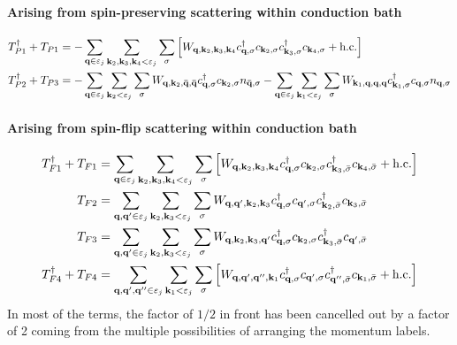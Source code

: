 \documentclass{revtex4-2}
\begin{document}
\paragraph{Arising from spin-preserving scattering within conduction bath}
\begin{equation}\begin{aligned}
	T_{P1}^\dagger + T_{P1} &= -\sum_{{\bf q} \in \varepsilon_j}\sum_{{\bf k}_2, {\bf k}_3, {\bf k}_4 < \varepsilon_j}\sum_{\sigma} \left[W_{{\bf q},{\bf k}_2,{\bf k}_3,{\bf k}_4}c^\dagger_{{\bf q},\sigma}c_{{\bf k}_2,\sigma}c^\dagger_{{\bf k}_3,\sigma}c_{{\bf k}_4,\sigma} + \text{h.c.}\right]\\
	T_{P2}^\dagger + T_{P3} &= -\sum_{{\bf q} \in \varepsilon_j}\sum_{{\bf k}_2 < \varepsilon_j}\sum_{\sigma} W_{{\bf q},{\bf k}_2,{\bf \bar q}, {\bf \bar q}} c^\dagger_{{\bf q},\sigma}c_{{\bf k}_2,\sigma} n_{{\bf \bar q},\sigma} -\sum_{{\bf q} \in \varepsilon_j}\sum_{{\bf k}_1 < \varepsilon_j}\sum_{\sigma} W_{{\bf k}_1,{\bf q},{\bf q},{\bf q}} c^\dagger_{{\bf k}_1,\sigma}c_{{\bf q},\sigma} n_{{\bf q},\sigma}
\end{aligned}\end{equation}
\paragraph{Arising from spin-flip scattering within conduction bath}
\begin{equation}\begin{aligned}
	T_{F1}^\dagger + T_{F1} &= \sum_{{\bf q} \in \varepsilon_j}\sum_{{\bf k}_2, {\bf k}_3, {\bf k}_4 < \varepsilon_j}\sum_{\sigma} \left[W_{{\bf q},{\bf k}_2,{\bf k}_3,{\bf k}_4}c^\dagger_{{\bf q},\sigma}c_{{\bf k}_2,\sigma}c^\dagger_{{\bf k}_3,\bar\sigma}c_{{\bf k}_4,\bar\sigma} + \text{h.c.}\right]\\
	T_{F2} &= \sum_{{\bf q}, {\bf q}^\prime \in \varepsilon_j}\sum_{{\bf k}_2, {\bf k}_3 < \varepsilon_j}\sum_{\sigma}W_{{\bf q},{\bf q}^\prime,{\bf k}_2,{\bf k}_3} c^\dagger_{{\bf q},\sigma}c_{{\bf q}^\prime,\sigma}c^\dagger_{{\bf k}_2,\bar\sigma}c_{{\bf k}_3,\bar\sigma}\\
	T_{F3} &= \sum_{{\bf q}, {\bf q}^\prime \in \varepsilon_j}\sum_{{\bf k}_2, {\bf k}_3 < \varepsilon_j}\sum_{\sigma} W_{{\bf q},{\bf k}_2,{\bf k}_3,{\bf q}^\prime} c^\dagger_{{\bf q},\sigma}c_{{\bf k}_2,\sigma}c^\dagger_{{\bf k}_3,\bar\sigma}c_{{\bf q}^\prime,\bar\sigma} \\
	T_{F4}^\dagger + T_{F4} &= \sum_{{\bf q}, {\bf q}^\prime, {\bf q}^{\prime\prime} \in \varepsilon_j}\sum_{{\bf k}_1 < \varepsilon_j}\sum_{\sigma} \left[W_{{\bf q},{\bf q}^\prime,{\bf q}^{\prime\prime}, {\bf k}_1}c^\dagger_{{\bf q},\sigma}c_{{\bf q}^\prime,\sigma}c^\dagger_{{\bf q}^{\prime\prime},\bar\sigma}c_{{\bf k}_1,\bar\sigma} + \text{h.c.}\right]
\end{aligned}\end{equation}
In most of the terms, the factor of \(1/2\) in front has been cancelled out by a factor of 2 coming from the multiple possibilities of arranging the momentum labels.
\end{document}
